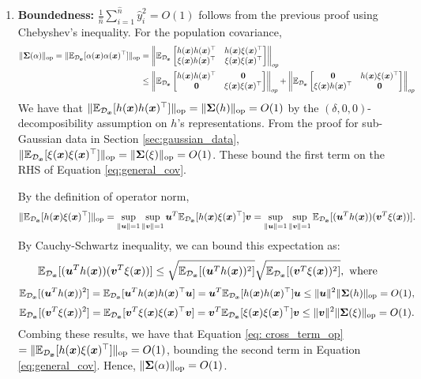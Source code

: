     \begin{enumerate}
        \item \textbf{Boundedness: }  $\frac{1}{\hat{n}}\sum_{i=1}^{\hat{n}} \hat{y}_i^2 = O(1)$ follows from the previous proof using Chebyshev's inequality. For the population covariance, 
        \begin{align}
            \lVert {\bm{\Sigma}}(\alpha) \rVert_{\mathrm{op}} = \lVert \mathbb{E}_{{\mathcal{D}}_{{\bm{x}}}}[\alpha({\bm{x}})\alpha({\bm{x}})^\top] \rVert_{\mathrm{op}} &= \left\|\mathbb{E}_{{\mathcal{D}}_{{\bm{x}}}}\begin{bmatrix}
               h({\bm{x}})h({\bm{x}})^\top & h({\bm{x}})\xi({\bm{x}})^\top\\
                \xi({\bm{x}})h({\bm{x}})^\top & \xi({\bm{x}})\xi({\bm{x}})^\top
            \end{bmatrix}\right\|_{op}  \notag \\ & \leq
            \left\|\mathbb{E}_{{\mathcal{D}}_{{\bm{x}}}}\begin{bmatrix}
               h({\bm{x}})h({\bm{x}})^\top & \mathbf{0} \\
                \mathbf{0} & \xi({\bm{x}})\xi({\bm{x}})^\top
            \end{bmatrix}\right\|_{op} + \left\|\mathbb{E}_{{\mathcal{D}}_{{\bm{x}}}}\begin{bmatrix}
               \mathbf{0} & h({\bm{x}})\xi({\bm{x}})^\top\\
                \xi({\bm{x}})h({\bm{x}})^\top & \mathbf{0} 
            \end{bmatrix}\right\|_{op} \label{eq:general_cov}
        \end{align}
        We have that $\lVert \mathbb{E}_{{\mathcal{D}}_{{\bm{x}}}}[h({\bm{x}})h({\bm{x}})^\top] \rVert_{\mathrm{op}} = \lVert {\bm{\Sigma}}(h) \rVert_{\mathrm{op}} = O(1)$ by the $(\delta, 0, 0)$-decomposibility assumption on $h$'s representations. From the proof for sub-Gaussian data in Section \ref{sec:gaussian_data}, $\lVert \mathbb{E}_{{\mathcal{D}}_{{\bm{x}}}}[\xi({\bm{x}})\xi({\bm{x}})^\top] \rVert_{\mathrm{op}} = \lVert {\bm{\Sigma}}(\xi) \rVert_{\mathrm{op}} = O(1)$. These bound the first term on the RHS of Equation \ref{eq:general_cov}. 

        By the definition of operator norm, 
        \begin{align} \label{eq: cross_term_op}
            \lVert \mathbb{E}_{{\mathcal{D}}_{{\bm{x}}}}[h({\bm{x}})\xi({\bm{x}})^\top] \rVert_{\mathrm{op}} = \sup_{\|{\bm{u}}\|=1} \sup_{\|{\bm{v}}\|=1} {\bm{u}}^T\mathbb{E}_{{\mathcal{D}}_{{\bm{x}}}}[ h({\bm{x}}) \xi({\bm{x}})^\top] {\bm{v}} =  \sup_{\|{\bm{u}}\|=1} \sup_{\|{\bm{v}}\|=1} \mathbb{E}_{{\mathcal{D}}_{{\bm{x}}}}[ ({\bm{u}}^Th({\bm{x}})) ({\bm{v}}^T\xi({\bm{x}}))]. 
        \end{align}
        By Cauchy-Schwartz inequality, we can bound this expectation as: 
        \[
            \mathbb{E}_{{\mathcal{D}}_{{\bm{x}}}}[ ({\bm{u}}^Th({\bm{x}})) ({\bm{v}}^T\xi({\bm{x}}))] \leq \sqrt{\mathbb{E}_{{\mathcal{D}}_{{\bm{x}}}}[ ({\bm{u}}^Th({\bm{x}}))^2]} \sqrt{\mathbb{E}_{{\mathcal{D}}_{{\bm{x}}}}[ ({\bm{v}}^T\xi({\bm{x}}))^2]}, \text{ where}
        \]
        \[
            \mathbb{E}_{{\mathcal{D}}_{{\bm{x}}}}[ ({\bm{u}}^Th({\bm{x}}))^2] = \mathbb{E}_{{\mathcal{D}}_{{\bm{x}}}}[ {\bm{u}}^Th({\bm{x}})h({\bm{x}})^\top{\bm{u}}]  = {\bm{u}}^T\mathbb{E}_{{\mathcal{D}}_{{\bm{x}}}}[ h({\bm{x}})h({\bm{x}})^\top] {\bm{u}} \leq \|{\bm{u}}\|^2\lVert {\bm{\Sigma}}(h) \rVert_{\mathrm{op}} = O(1),
        \]
        \[
            \mathbb{E}_{{\mathcal{D}}_{{\bm{x}}}}[ ({\bm{v}}^T\xi({\bm{x}}))^2] = \mathbb{E}_{{\mathcal{D}}_{{\bm{x}}}}[ {\bm{v}}^T\xi({\bm{x}})\xi({\bm{x}})^\top{\bm{v}}]  = {\bm{v}}^T\mathbb{E}_{{\mathcal{D}}_{{\bm{x}}}}[\xi({\bm{x}})\xi({\bm{x}})^\top] {\bm{v}} \leq \|{\bm{v}}\|^2\lVert {\bm{\Sigma}}(\xi) \rVert_{\mathrm{op}} = O(1). 
        \]
        Combing these results, we have that Equation \ref{eq: cross_term_op} $= \lVert \mathbb{E}_{{\mathcal{D}}_{{\bm{x}}}}[h({\bm{x}})\xi({\bm{x}})^\top] \rVert_{\mathrm{op}} = O(1)$, bounding the second term in Equation \ref{eq:general_cov}. Hence, $\lVert {\bm{\Sigma}}(\alpha) \rVert_{\mathrm{op}} = O(1)$. 
        

\end{enumerate}
